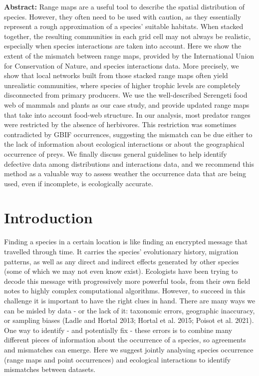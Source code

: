 \documentclass[11pt]{article}
\begin{document}
\vfill
\textbf{\sffamily Abstract: }Range maps are a useful tool to describe
the spatial distribution of species. However, they often need to be used
with caution, as they essentially represent a rough approximation of a
species' suitable habitats. When stacked together, the resulting
communities in each grid cell may not always be realistic, especially
when species interactions are taken into account. Here we show the
extent of the mismatch between range maps, provided by the International
Union for Conservation of Nature, and species interactions data. More
precisely, we show that local networks built from those stacked range
maps often yield unrealistic communities, where species of higher
trophic levels are completely disconnected from primary producers. We
use the well-described Serengeti food web of mammals and plants as our
case study, and provide updated range maps that take into account
food-web structure. In our analysis, most predator ranges were
restricted by the absence of herbivores. This restriction was sometimes
contradicted by GBIF occurrences, suggesting the mismatch can be due
either to the lack of information about ecological interactions or about
the geographical occurrence of preys. We finally discuss general
guidelines to help identify defective data among distributions and
interactions data, and we recommend this method as a valuable way to
assess weather the occurrence data that are being used, even if
incomplete, is ecologically accurate.
\vfill

\clearpage
\linenumbers
\pagestyle{normal}

\hypertarget{introduction}{%
\section{Introduction}\label{introduction}}

Finding a species in a certain location is like finding an encrypted
message that travelled through time. It carries the species'
evolutionary history, migration patterns, as well as any direct and
indirect effects generated by other species (some of which we may not
even know exist). Ecologists have been trying to decode this message
with progressively more powerful tools, from their own field notes to
highly complex computational algorithms. However, to succeed in this
challenge it is important to have the right clues in hand. There are
many ways we can be misled by data - or the lack of it: taxonomic
errors, geographic inaccuracy, or sampling biases (Ladle and Hortal
2013; Hortal et al. 2015; Poisot et al. 2021). One way to identify - and
potentially fix - these errors is to combine many different pieces of
information about the occurrence of a species, so agreements and
mismatches can emerge. Here we suggest jointly analysing species
occurrence (range maps and point occurrences) and ecological
interactions to identify mismatches between datasets.
\end{document}
